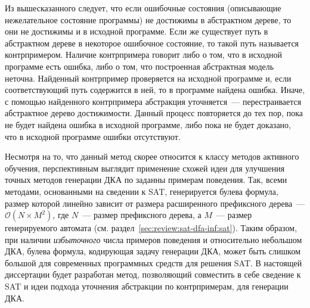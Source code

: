 Из вышесказанного следует, что если ошибочные состояния (описывающие нежелательное состояние программы) не достижимы в абстрактном дереве, то они не достижимы и в исходной программе.
Если же существует путь в абстрактном дереве в некоторое ошибочное состояние, то такой путь называется контрпримером.
Наличие контрпримера говорит либо о том, что в исходной программе есть ошибка, либо о том, что построенная абстрактная модель неточна.
Найденный контрпример проверяется на исходной программе и, если соответствующий путь содержится в ней, то в программе найдена ошибка.
Иначе, с помощью найденного контрпримера абстракция уточняется~--- перестраивается абстрактное дерево достижимости.
Данный процесс повторяется до тех пор, пока не будет найдена ошибка в исходной программе, либо пока не будет доказано, что в исходной программе ошибки отсутствуют.

Несмотря на то, что данный метод скорее относится к классу методов активного обучения, перспективным выглядит применение схожей идеи для улучшения точных методов генерации ДКА по заданны примерам поведения.
Так, всеми методами, основанными на сведении к SAT, генерируется булева формула, размер которой линейно зависит от размера расширенного префиксного дерева~--- $\mathcal{O}\left(N\times M^{2}\right)$, где $N$~--- размер префиксного дерева, а $M$~--- размер генерируемого автомата (см. раздел~\ref{sec:review:sat-dfa-inf:sat}).
Таким образом, при наличии \emph{избыточного} числа примеров поведения и относительно небольшом ДКА, булева формула, кодирующая задачу генерации ДКА, может быть слишком большой для современных программных средств для решения SAT.
В настоящей диссертации будет разработан метод, позволяющий совместить в себе сведение к SAT и идеи подхода уточнения абстракции по контрпримерам, для генерации ДКА.





